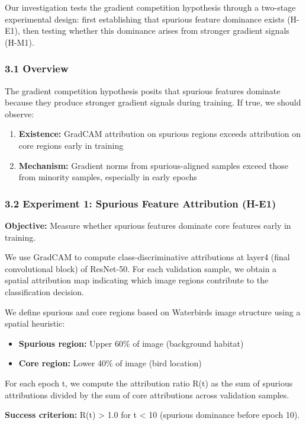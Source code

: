 
Our investigation tests the gradient competition hypothesis through a two-stage experimental design: first establishing that spurious feature dominance exists (H-E1), then testing whether this dominance arises from stronger gradient signals (H-M1).

\subsubsection{3.1 Overview}

The gradient competition hypothesis posits that spurious features dominate because they produce stronger gradient signals during training. If true, we should observe:

\begin{enumerate}
\item \textbf{Existence:} GradCAM attribution on spurious regions exceeds attribution on core regions early in training
\item \textbf{Mechanism:} Gradient norms from spurious-aligned samples exceed those from minority samples, especially in early epochs
\end{enumerate}

\subsubsection{3.2 Experiment 1: Spurious Feature Attribution (H-E1)}

\textbf{Objective:} Measure whether spurious features dominate core features early in training.

We use GradCAM to compute class-discriminative attributions at layer4 (final convolutional block) of ResNet-50. For each validation sample, we obtain a spatial attribution map indicating which image regions contribute to the classification decision.

We define spurious and core regions based on Waterbirds image structure using a spatial heuristic:
\begin{itemize}
\item \textbf{Spurious region:} Upper 60\% of image (background habitat)
\item \textbf{Core region:} Lower 40\% of image (bird location)
\end{itemize}

For each epoch t, we compute the attribution ratio R(t) as the sum of spurious attributions divided by the sum of core attributions across validation samples.

\textbf{Success criterion:} R(t) > 1.0 for t < 10 (spurious dominance before epoch 10).

